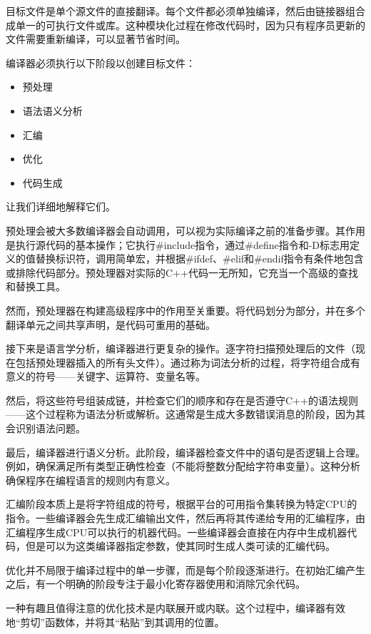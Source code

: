 目标文件是单个源文件的直接翻译。每个文件都必须单独编译，然后由链接器组合成单一的可执行文件或库。这种模块化过程在修改代码时，因为只有程序员更新的文件需要重新编译，可以显著节省时间。

编译器必须执行以下阶段以创建目标文件：

\begin{itemize}
\item
预处理

\item
语法语义分析

\item
汇编

\item
优化

\item
代码生成
\end{itemize}

让我们详细地解释它们。

预处理会被大多数编译器会自动调用，可以视为实际编译之前的准备步骤。其作用是执行源代码的基本操作；它执行\#include指令，通过\#define指令和-D标志用定义的值替换标识符，调用简单宏，并根据\#ifdef、\#elif和\#endif指令有条件地包含或排除代码部分。预处理器对实际的C++代码一无所知，它充当一个高级的查找和替换工具。

然而，预处理器在构建高级程序中的作用至关重要。将代码划分为部分，并在多个翻译单元之间共享声明，是代码可重用的基础。

接下来是语言学分析，编译器进行更复杂的操作。逐字符扫描预处理后的文件（现在包括预处理器插入的所有头文件）。通过称为词法分析的过程，将字符组合成有意义的符号——关键字、运算符、变量名等。

然后，将这些符号组装成链，并检查它们的顺序和存在是否遵守C++的语法规则——这个过程称为语法分析或解析。这通常是生成大多数错误消息的阶段，因为其会识别语法问题。

最后，编译器进行语义分析。此阶段，编译器检查文件中的语句是否逻辑上合理。例如，确保满足所有类型正确性检查（不能将整数分配给字符串变量）。这种分析确保程序在编程语言的规则内有意义。

汇编阶段本质上是将字符组成的符号，根据平台的可用指令集转换为特定CPU的指令。一些编译器会先生成汇编输出文件，然后再将其传递给专用的汇编程序，由汇编程序生成CPU可以执行的机器代码。一些编译器会直接在内存中生成机器代码，但是可以为这类编译器指定参数，使其同时生成人类可读的汇编代码。

优化并不局限于编译过程中的单一步骤，而是每个阶段逐渐进行。在初始汇编产生之后，有一个明确的阶段专注于最小化寄存器使用和消除冗余代码。

一种有趣且值得注意的优化技术是内联展开或内联。这个过程中，编译器有效地“剪切”函数体，并将其“粘贴”到其调用的位置。

